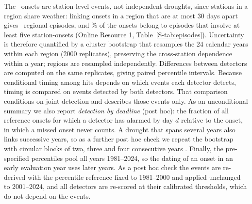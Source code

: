 \documentclass[pdflatex,sn-mathphys-ay]{sn-jnl}
\theoremstyle{thmstyletwo}
\begin{document}
The \nevall\ onsets are station-level events, not independent droughts, since stations in a region share
weather: linking onsets in a region that are at most 30 days apart gives \nepisodesall\ regional
episodes, and \shareepisodes\% of the onsets belong to episodes that involve at least five station-onsets
(Online Resource 1, Table~\ref{S-tab:episodes}). Uncertainty is therefore quantified by a cluster
bootstrap \citep{davison1997} that resamples the 24 calendar years within each region (2000 replicates),
preserving the cross-station dependence within a year; regions are resampled independently. Differences
between detectors are computed on the same replicates, giving paired percentile intervals. Because
conditional timing among hits depends on which events each detector detects, timing is compared on
events detected by both detectors. That comparison conditions on joint detection and describes those
events only. As an unconditional summary we also report \emph{detection by deadline} (post hoc): the
fraction of all reference onsets for which a detector has alarmed by day $d$ relative to the onset, in
which a missed onset never counts. A drought that spans several years also links successive years, so as
a further post hoc check we repeat the bootstrap with circular blocks of two, three and four consecutive
years \citep{kunsch1989}. Finally, the pre-specified percentiles pool all years 1981--2024, so the dating
of an onset in an early evaluation year uses later years. As a post hoc check the events are re-derived
with the percentile reference fixed to 1981--2000 and applied unchanged to 2001--2024, and all detectors
are re-scored at their calibrated thresholds, which do not depend on the events.
\end{document}
